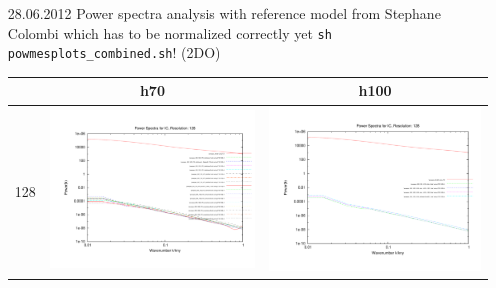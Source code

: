 \documentclass[a4paper,11pt,fleqn,oneside]{book}
\begin{document}
\begin{itemize}
\begin{table}
\begin{tabular}{l|c|c}
 \end{tabular}
\end{table}

\item[28.06.2012]
Power spectra analysis with reference model from Stephane Colombi which has to be 
normalized correctly yet \texttt{sh powmesplots\_combined.sh}! (2DO) 

\begin{table}
\begin{tabular}{l|c|c}
 & h70 & h100 \\
\hline 
 128 & \includegraphics[scale=0.2]{analysis/powerspectra/IC_powspec_combined_128_h70.pdf} & \includegraphics[scale=0.2]{analysis/powerspectra/IC_powspec_combined_128_h100.pdf} \\

\end{tabular}
\end{table}
\end{itemize}
\end{document}
